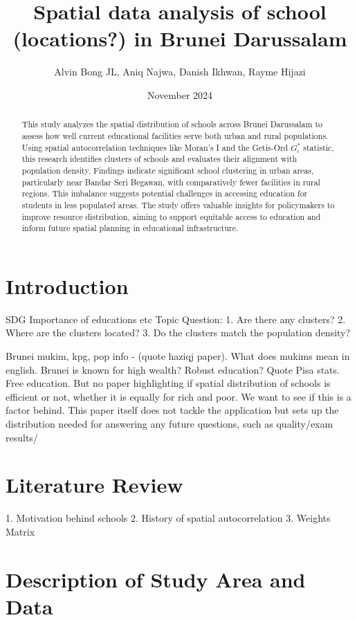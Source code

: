 \documentclass[12pt]{article}
\title{Spatial data analysis of school (locations?) in Brunei Darussalam }
\author{Alvin Bong JL, Aniq Najwa, Danish Ikhwan, Rayme Hijazi}
\date{November 2024}
\begin{document}
\maketitle
\begin{abstract}
This study analyzes the spatial distribution of schools across Brunei Darussalam to assess how well current educational facilities serve both urban and rural populations. Using spatial autocorrelation techniques like Moran’s I and the Getis-Ord \( G_i^* \) statistic, this research identifies clusters of schools and evaluates their alignment with population density. Findings indicate significant school clustering in urban areas, particularly near Bandar Seri Begawan, with comparatively fewer facilities in rural regions. This imbalance suggests potential challenges in accessing education for students in less populated areas. The study offers valuable insights for policymakers to improve resource distribution, aiming to support equitable access to education and inform future spatial planning in educational infrastructure. 
\end{abstract}


\section{Introduction}
SDG
Importance of educations etc
Topic Question:
	1. Are there any clusters?
	2. Where are the clusters located?
	3. Do the clusters match the population density?

Brunei mukim, kpg, pop info -  (quote haziqj paper). What does mukims mean in english.
Brunei is known for high wealth? Robust education? Quote Pisa stats. Free education. But no paper highlighting if spatial distribution of schools is efficient or not, whether it is equally for rich and poor. We want to see if this is a factor behind. This paper itself does not tackle the application but sets up the distribution needed for answering any future questions, such as quality/exam results/

\section{Literature Review}
1. Motivation behind schools
2. History of spatial autocorrelation
3. Weights Matrix



\section{Description of Study Area and Data}
\end{document}
